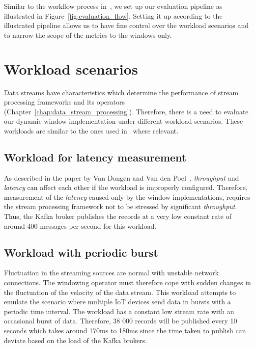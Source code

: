 Similar to the workflow process in~\cite{evalution_of_spe, benchmark_sce}, we set up
our evaluation pipeline as illustrated in Figure~\ref{fig:evaluation_flow}. Setting it 
up according to the illustrated pipeline allows us to have fine control over the 
workload scenarios and to narrow the scope of the metrics to the windows only. 




\section{Workload scenarios}
\label{sec:workload}
Data streams have characteristics 
which determine the performance of stream processing frameworks and its 
operators (Chapter~\ref{chap:data_stream_processing}). Therefore, 
there is a need to evaluate our dynamic window implementation under different workload scenarios. 
These workloads are similar to the ones used in~\cite{evalution_of_spe} where relevant.

\subsection{Workload for latency measurement}
As described in the paper by Van Dongen and Van den Poel~\cite{evalution_of_spe}, 
\emph{throughput} and \emph{latency} can affect each other if the workload is 
improperly configured. Therefore, measurement of the \emph{latency} caused only 
by the window implementations, requires the stream processing framework not to be 
stressed by significant \emph{throughput}. Thus, the Kafka broker 
publishes the records at a very low constant rate of around 400 messages per second for 
this workload. 


\subsection{Workload with periodic burst}
Fluctuation in the streaming sources are normal with unstable network connections. 
The windowing operator must therefore cope with sudden changes in the 
fluctuation of the velocity of the data stream. This workload attempts to emulate 
the scenario where multiple IoT devices send data in bursts with a periodic 
time interval. The workload has a constant low stream rate with an occasional 
burst of data. Therefore, 38 000 records will be published every 10 seconds which 
takes around 170ms to 180ms since the time taken to publish can deviate based on the 
load of the Kafka brokers. 


